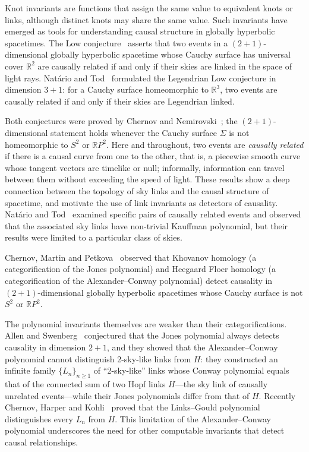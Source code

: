 \documentclass[11pt]{article}
\theoremstyle{definition}
\newcommand{\R}{\mathbb{R}}
\begin{document}
Knot invariants are functions that assign the same value to equivalent knots or links, although
distinct knots may share the same value. Such invariants have emerged as tools for understanding
causal structure in globally hyperbolic spacetimes. The Low conjecture~\cite{Low88} asserts that two
events in a $(2+1)$-dimensional globally hyperbolic spacetime whose Cauchy surface has universal cover
$\R^2$ are causally related if and only if their skies are linked in the space of light rays.
Nat\'ario and Tod~\cite{NT04} formulated the Legendrian Low conjecture in dimension $3+1$: for a
Cauchy surface homeomorphic to $\R^3$, two events are causally related if and only if their skies
are Legendrian linked.

Both conjectures were proved by Chernov and Nemirovski~\cite{CN10}; the $(2+1)$-dimensional
statement holds whenever the Cauchy surface $\Sigma$ is not homeomorphic to $S^2$ or $\R P^2$. Here
and throughout, two events are \emph{causally related} if there is a causal curve from one to the
other, that is, a piecewise smooth curve whose tangent vectors are timelike or null; informally,
information can travel between them without exceeding the speed of light. These results show a deep
connection between the topology of sky links and the causal structure of spacetime, and motivate the
use of link invariants as detectors of causality. Nat\'ario and Tod~\cite{NT04} examined specific
pairs of causally related events and observed that the associated sky links have non-trivial
Kauffman polynomial, but their results were limited to a particular class of skies.

Chernov, Martin and Petkova~\cite{CMP20} observed that Khovanov homology (a categorification of the
Jones polynomial) and Heegaard Floer homology (a categorification of the Alexander--Conway polynomial)
detect causality in $(2+1)$-dimensional globally hyperbolic spacetimes whose Cauchy surface is not
$S^2$ or $\R P^2$.

The polynomial invariants themselves are weaker than their categorifications. Allen and
Swenberg~\cite{AS21} conjectured that the Jones polynomial always detects causality in dimension
$2+1$, and they showed that the Alexander--Conway polynomial cannot distinguish 2-sky-like links from
$H$: they constructed an infinite family $\{L_n\}_{n\ge1}$ of ``2-sky-like'' links whose Conway polynomial
equals that of the connected sum of two Hopf links $H$---the sky link of causally unrelated events---while their Jones polynomials
differ from that of $H$. Recently Chernov, Harper and Kohli~\cite{CHK26} proved that the Links--Gould
polynomial distinguishes every $L_n$ from $H$. This limitation of the Alexander--Conway polynomial
underscores the need for other computable invariants that detect causal relationships.
\end{document}

